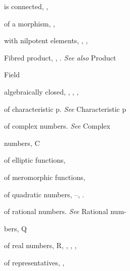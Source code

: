 {{\noindent\hspace*{7.5bp}is connected, , \par
\noindent\hspace*{7.5bp}of a morphism, , \par
\noindent\hspace*{7.5bp}with nilpotent elements, , , \par
\noindent\hspace*{0.0bp}Fibred product, , . \emph{See also} Product\par
\noindent\hspace*{0.0bp}Field\par
\noindent\hspace*{7.5bp}algebraically closed, , , , \par
\noindent\hspace*{7.5bp}of characteristic p. \emph{See} Characteristic p\par
\noindent\hspace*{7.5bp}of complex numbers. \emph{See} Complex\par
\noindent\hspace*{15.0bp}numbers, C\par
\noindent\hspace*{7.5bp}of elliptic functions, \par
\noindent\hspace*{7.5bp}of meromorphic functions, \par
\noindent\hspace*{7.5bp}of quadratic numbers, --, .\par
\noindent\hspace*{15.0bp}\par
\noindent\hspace*{7.5bp}of rational numbers. \emph{See} Rational num-\par
\noindent\hspace*{15.0bp}bers, Q\par
\noindent\hspace*{7.5bp}of real numbers, R, , , , \par
\noindent\hspace*{7.5bp}of representatives, , \par
}}
